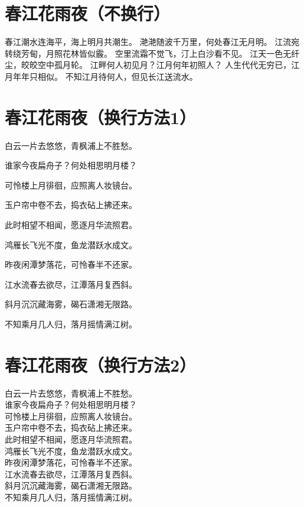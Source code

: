 \documentclass{article}
\begin{document}
\section{春江花雨夜（不换行）}  %
春江潮水连海平，海上明月共潮生。
滟滟随波千万里，何处春江无月明。
江流宛转绕芳甸，月照花林皆似霰。
空里流霜不觉飞，汀上白沙看不见。
江天一色无纤尘，皎皎空中孤月轮。
江畔何人初见月？江月何年初照人？
人生代代无穷已，江月年年只相似。
不知江月待何人，但见长江送流水。


\section{春江花雨夜（换行方法1）}

白云一片去悠悠，青枫浦上不胜愁。

谁家今夜扁舟子？何处相思明月楼？

可怜楼上月徘徊，应照离人妆镜台。

玉户帘中卷不去，捣衣砧上拂还来。

此时相望不相闻，愿逐月华流照君。

鸿雁长飞光不度，鱼龙潜跃水成文。



昨夜闲潭梦落花，可怜春半不还家。

江水流春去欲尽，江潭落月复西斜。

斜月沉沉藏海雾，碣石潇湘无限路。

不知乘月几人归，落月摇情满江树。

\section{春江花雨夜（换行方法2）}

\noindent   %
白云一片去悠悠，青枫浦上不胜愁。\\
谁家今夜扁舟子？何处相思明月楼？\\
可怜楼上月徘徊，应照离人妆镜台。\\
玉户帘中卷不去，捣衣砧上拂还来。\\
此时相望不相闻，愿逐月华流照君。\\
鸿雁长飞光不度，鱼龙潜跃水成文。\\
昨夜闲潭梦落花，可怜春半不还家。\\
江水流春去欲尽，江潭落月复西斜。\\
斜月沉沉藏海雾，碣石潇湘无限路。\\
不知乘月几人归，落月摇情满江树。
\end{document}
